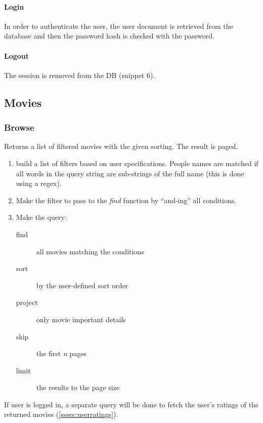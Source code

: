 \documentclass[11pt]{article}
\begin{document}
\paragraph{Login}
In order to authenticate the user, the user document is retrieved from the database and then the password hash is checked with the password. 

\paragraph{Logout}
The session is removed from the DB (snippet 6).



\subsection{Movies}
\subsubsection{Browse}
Returns a list of filtered movies with the given sorting. The result is paged.

\begin{enumerate}
	\item build a list of filters based on user specifications. People names are
			matched if all words in the query string are sub-strings of the full 
			name (this is done using a regex).
	\item Make the filter to pass to the \emph{find} function by ``and-ing'' all 
			conditions.
	\item Make the query:
		\begin{description}
			\item[find] all movies matching the conditions
			\item[sort] by the user-defined sort order
			\item[project] only movie important details
			\item[skip] the first \emph{n} pages
			\item[limit] the results to the page size
		\end{description}
\end{enumerate}

If user is logged in, a separate query will be done to fetch the user's ratings of the returned movies (\ref{sssec:userratings}).


\end{document}
